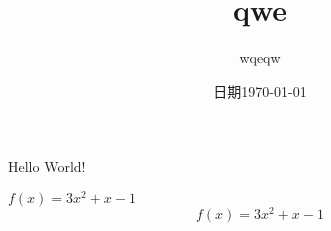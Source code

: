 \documentclass{article}	%
\title{qwe}
\author{wqeqw}
\date{日期\today}
\begin{document}
	\maketitle	%
	Hello World!
	
	$f(x)=3x^2+x-1$	%
	$$f(x)=3x^2+x-1$$
	
	
	
	
	
	
	
	
	
	
	
	
\end{document}
